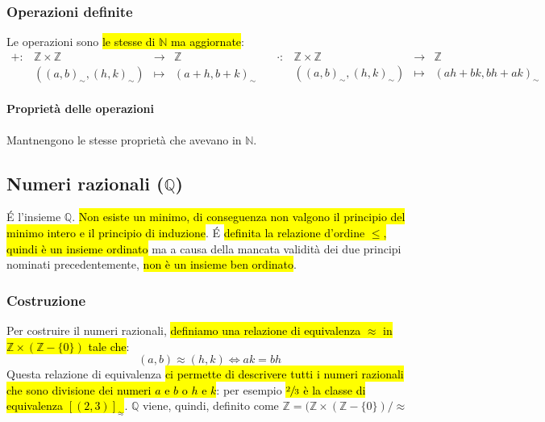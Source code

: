 \subsubsection{Operazioni definite} 
Le operazioni sono \hl{le stesse di $\mathbb{N}$ ma aggiornate}:
\[
    \begin{array}{cccc}
        +: &\mathbb{Z} \times \mathbb{Z} &\to &\mathbb{Z} \\
        &((a, b)_{\sim}, (h,k)_{\sim}) &\mapsto & (a+h, b+k)_{\sim}
    \end{array} \quad
    \begin{array}{cccc}
        \cdot: &\mathbb{Z} \times \mathbb{Z} &\to &\mathbb{Z} \\
        &((a, b)_{\sim}, (h,k)_{\sim}) &\mapsto & (ah + bk, bh + ak)_{\sim}
    \end{array}
\]

\paragraph{Proprietà delle operazioni} Mantnengono le stesse proprietà che 
avevano in $\mathbb{N}$.

\subsection{Numeri razionali ($\mathbb{Q}$)}
\'E l'insieme $\mathbb{Q}$. \hl{Non esiste un minimo, di conseguenza non valgono 
il principio del minimo intero e il principio di induzione}. \'E \hl{definita la
relazione d'ordine $\leq$, quindi è un insieme ordinato} ma a causa della
mancata validità dei due principi nominati precedentemente, \hl{non è un insieme
ben ordinato}.

\subsubsection{Costruzione}
Per costruire il numeri razionali, \hl{definiamo una relazione di equivalenza 
$\approx$ in $\mathbb{Z} \times (\mathbb{Z} - \{0\})$ tale che}:
\[ (a,b) \approx (h,k) \iff ak=bh \]
Questa relazione di equivalenza \hl{ci permette di descrivere tutti i numeri razionali
che sono divisione dei numeri $a$ e $b$ o $h$ e $k$}: per esempio \hl{$\sfrac{2}{3}$
è la classe di equivalenza $[(2,3)]_{\approx}$}. $\mathbb{Q}$ viene, quindi, 
definito come $\mathbb{Z} = (\mathbb{Z} \times (\mathbb{Z} - \{0\}) / \approx$

